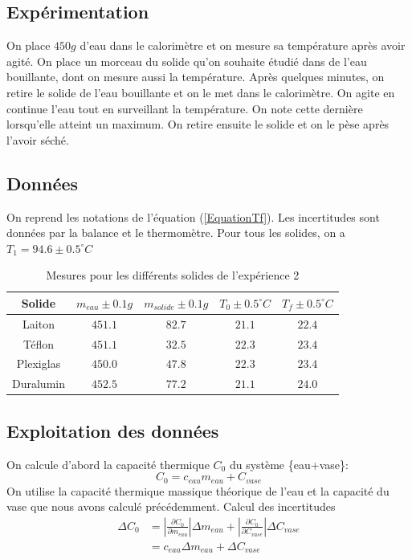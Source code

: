 \documentclass[12pt]{article}
\begin{document}
\subsection{Expérimentation}
On place $450g$ d'eau dans le calorimètre et on mesure sa température après avoir agité. On place un morceau du solide qu'on souhaite étudié dans de l'eau bouillante, dont on mesure aussi la température. Après quelques minutes, on retire le solide de l'eau bouillante et on le met dans le calorimètre. On agite en continue l'eau tout en surveillant la température. On note cette dernière lorsqu'elle atteint un maximum. On retire ensuite le solide et on le pèse après l'avoir séché.

\subsection{Données}
On reprend les notations de l'équation (\ref{EquationTf}). Les incertitudes sont données par la balance et le thermomètre. Pour tous les solides, on a $T_1=94.6\pm 0.5^{\circ}C$
\begin{table}[h!]
	\begin{center}
		\begin{tabular}{|c|c|c|c|c|}
		\hline
		Solide & $m_{eau} \pm 0.1g$ & $m_{solide}\pm 0.1g$ & $T_0\pm 0.5^{\circ}C$ & $T_f\pm 0.5^{\circ}C$\\ \hline
		Laiton & $451.1$ & $82.7$ & $21.1$ & $22.4$ \\
		Téflon & $451.1$ & $32.5$ & $22.3$ & $23.4$ \\
		Plexiglas & $450.0$ & $47.8$ & $22.3$ & $23.4$ \\
		Duralumin & $452.5$ & $77.2$ & $21.1$ & $24.0$ \\ \hline
		\end{tabular}
		\caption{Mesures pour les différents solides de l'expérience 2}
		\label{table:mesureexp2}
	\end{center}
\end{table}

\subsection{Exploitation des données}
On calcule d'abord la capacité thermique $C_0$ du système \{eau+vase\}:
\begin{equation}
C_0=c_{eau}m_{eau}+C_{vase}
\end{equation}
On utilise la capacité thermique massique théorique de l'eau et la capacité du vase que nous avons calculé précédemment. Calcul des incertitudes
\begin{align*}
\Delta C_0&=\displaystyle\left\lvert \frac{\partial C_0}{\partial m_{eau}}\right\rvert \Delta m_{eau} + \displaystyle\left\lvert \frac{\partial C_0}{\partial C_{vase}}\right\rvert \Delta C_{vase}\\
&=c_{eau}\Delta m_{eau}+\Delta C_{vase}
\end{align*}
\end{document}
